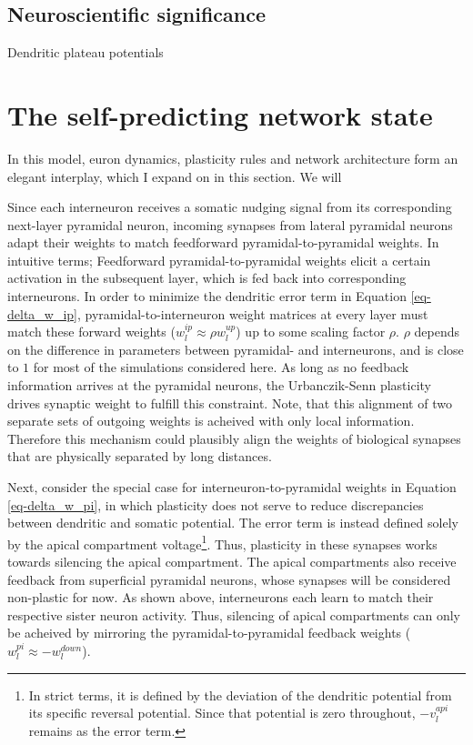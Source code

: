 \subsection{Neuroscientific significance}


Dendritic plateau potentials


\section{The self-predicting network state}\label{sec-selfpred}

In this model, euron dynamics, plasticity rules and network architecture form an elegant interplay, which I expand on in
this section. We will

Since each interneuron receives a somatic nudging signal from its corresponding next-layer pyramidal neuron, incoming
synapses from lateral pyramidal neurons adapt their weights to match feedforward pyramidal-to-pyramidal weights. In
intuitive terms; Feedforward pyramidal-to-pyramidal weights elicit a certain activation in the subsequent layer, which
is fed back into corresponding interneurons. In order to minimize the dendritic error term in Equation
\ref{eq-delta_w_ip}, pyramidal-to-interneuron weight matrices at every layer must match these forward weights ($w_l^{ip}
\approx \rho w_l^{up}$) up to some scaling factor $\rho$. $\rho$ depends on the difference in parameters between
pyramidal- and interneurons, and is close to $1$ for most of the simulations considered here. As long as no feedback
information arrives at the pyramidal neurons, the Urbanczik-Senn plasticity drives synaptic weight to fulfill this
constraint. Note, that this alignment of two separate sets of outgoing weights is acheived with only local information.
Therefore this mechanism could plausibly align the weights of biological synapses that are physically separated by long
distances. \newline

Next, consider the special case for interneuron-to-pyramidal weights in Equation \ref{eq-delta_w_pi}, in which
plasticity does not serve to reduce discrepancies between dendritic and somatic potential. The error term is instead
defined solely by the apical compartment voltage\footnote{In strict terms, it is defined by the deviation of the
dendritic potential from its specific reversal potential. Since that potential is zero throughout, $- v_l^{api}$ remains
as the error term.}. Thus, plasticity in these synapses works towards silencing the apical compartment. The apical
compartments also receive feedback from superficial pyramidal neurons, whose synapses will be considered non-plastic for
now. As shown above, interneurons each learn to match their respective sister neuron activity. Thus, silencing of apical
compartments can only be acheived by mirroring the pyramidal-to-pyramidal feedback weights ($w_l^{pi} \approx
-w_l^{down}$).\newline

